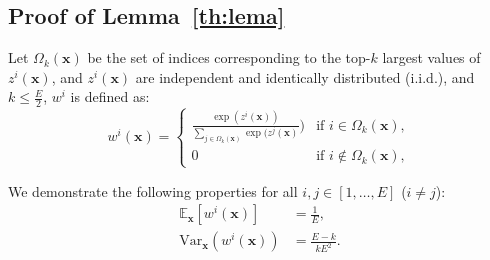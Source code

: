 \subsection{Proof of Lemma~\ref{th:lema}}
\begin{tcolorbox}[colback=gray!20,colframe=gray]
\begin{lemma2}[3.3]
Let $\Omega_k(\mathbf{x})$ be the set of indices corresponding to the top-$k$ largest values of $z^i(\mathbf{x})$, and \( z^i(\mathbf{x}) \) are independent and identically distributed (i.i.d.), and \( k \leq \frac{E}{2} \), $w^i$ is defined as:
\begin{equation}
    w^i(\mathbf{x}) = 
    \begin{cases} 
        \frac{\exp(z^i(\mathbf{x}))}{\sum_{j \in \Omega_k(\mathbf{x})} \exp(z^j(\mathbf{x})}) & \text{if } i \in \Omega_k(\mathbf{x}), \\
        0 & \text{if } i \notin \Omega_k(\mathbf{x}),
    \end{cases}
\end{equation}
 
We demonstrate the following properties for all \( i, j \in [1, \dots, E] \) (\( i \neq j \)):
\begin{align}
\mathbb{E}_{\mathbf{x}}[w^i(\mathbf{x})] &= \frac{1}{E}, \\
\text{Var}_{\mathbf{x}}(w^i(\mathbf{x})) &= \frac{E-k}{kE^2}.
\end{align}
\end{lemma2}
\end{tcolorbox}

